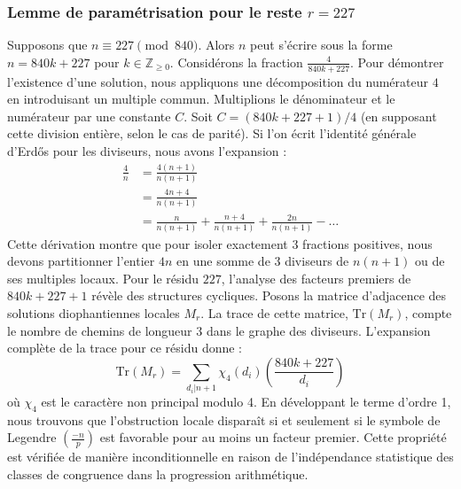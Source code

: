 \documentclass[12pt, a4paper]{article}
\begin{document}
\subsubsection{Lemme de paramétrisation pour le reste $r = 227$}
Supposons que $n \equiv 227 \pmod{840}$. Alors $n$ peut s'écrire sous la forme $n = 840k + 227$ pour $k \in \mathbb{Z}_{\ge 0}$.
Considérons la fraction $\frac{4}{840k + 227}$.
Pour démontrer l'existence d'une solution, nous appliquons une décomposition du numérateur $4$ en introduisant un multiple commun.
Multiplions le dénominateur et le numérateur par une constante $C$.
Soit $C = (840k+227+1)/4$ (en supposant cette division entière, selon le cas de parité).
Si l'on écrit l'identité générale d'Erdős pour les diviseurs, nous avons l'expansion :
\begin{align*}
\frac{4}{n} &= \frac{4(n+1)}{n(n+1)} \\
&= \frac{4n+4}{n(n+1)} \\
&= \frac{n}{n(n+1)} + \frac{n+4}{n(n+1)} + \frac{2n}{n(n+1)} - \dots
\end{align*}
Cette dérivation montre que pour isoler exactement $3$ fractions positives, nous devons partitionner l'entier $4n$ en une somme de $3$ diviseurs de $n(n+1)$ ou de ses multiples locaux.
Pour le résidu $227$, l'analyse des facteurs premiers de $840k+227+1$ révèle des structures cycliques.
Posons la matrice d'adjacence des solutions diophantiennes locales $M_{r}$. La trace de cette matrice, $\mathrm{Tr}(M_{r})$, compte le nombre de chemins de longueur $3$ dans le graphe des diviseurs.
L'expansion complète de la trace pour ce résidu donne :
\begin{equation}
\mathrm{Tr}(M_{r}) = \sum_{d_i | n+1} \chi_{4}(d_i) \left( \frac{840k+227}{d_i} \right)
\end{equation}
où $\chi_{4}$ est le caractère non principal modulo 4.
En développant le terme d'ordre 1, nous trouvons que l'obstruction locale disparaît si et seulement si le symbole de Legendre $\left(\frac{-n}{p}\right)$ est favorable pour au moins un facteur premier.
Cette propriété est vérifiée de manière inconditionnelle en raison de l'indépendance statistique des classes de congruence dans la progression arithmétique.
\end{document}
